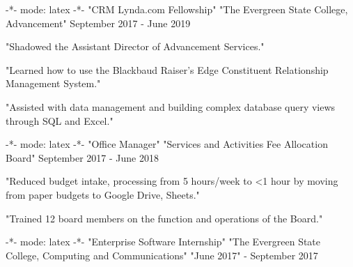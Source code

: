-*- mode: latex -*-
  \cventry
    { "CRM Lynda.com Fellowship" } %
    {  } %
    { "The Evergreen State College, Advancement" } %
    { September 2017 - June 2019 } %
    {
      \begin{cvitems} %
        \item { "Shadowed the Assistant Director of Advancement Services." }
        \item { "Learned how to use the Blackbaud Raiser's Edge Constituent Relationship Management System." }
        \item { "Assisted with data management and building complex database query views through SQL and Excel." }
      \end{cvitems}
    }
-*- mode: latex -*-
  \cventry
    { "Office Manager" } %
    {  } %
    { "Services and Activities Fee Allocation Board" } %
    { September 2017 - June 2018 } %
    {
      \begin{cvitems} %
        \item { "Reduced budget intake, processing from 5 hours/week to <1 hour by moving from paper budgets to Google Drive, Sheets." }
        \item { "Trained 12 board members on the function and operations of the Board." }
        \item {  }
      \end{cvitems}
    }
-*- mode: latex -*-
  \cventry
    { "Enterprise Software Internship" } %
    {  } %
    { "The Evergreen State College, Computing and Communications" } %
    { "June 2017" - September 2017 } %
    {
      \begin{cvitems} %
        \item {  }
        \item {  }
        \item {  }
      \end{cvitems}
    }
